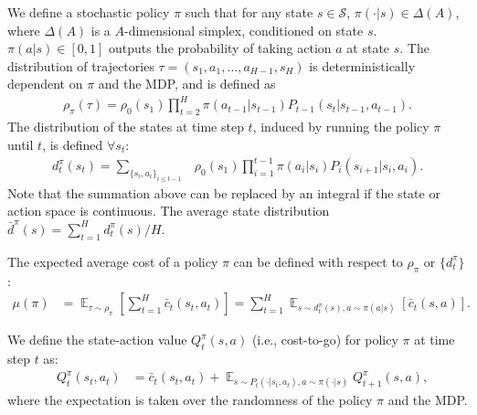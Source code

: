 \documentclass{article}
\begin{document}
We define a stochastic policy $\pi$ such that for any state $s\in\mathcal{S}$, $\pi(\cdot | s)\in \Delta(A)$, where $\Delta(A)$ is a $A$-dimensional simplex, conditioned on state $s$. $\pi(a|s)\in[0,1]$ outputs the probability of taking action $a$ at state $s$. The distribution of trajectories $\tau = (s_1, a_1, \hdots,a_{H-1}, s_H)$ is deterministically dependent on $\pi$ and the MDP, and is defined as
\begin{align}
\rho_{\pi}(\tau) = \rho_0(s_1) \prod_{t=2}^{H} \pi(a_{t-1}|s_{t-1})P_{t-1}(s_t|s_{t-1}, a_{t-1}).\nonumber
\end{align}
%
%
The distribution of the states at time step $t$, induced by running the policy $\pi$ until $t$, is defined  $\forall s_t$:
\begin{align}
d_t^{\pi}(s_{t}) = \sum_{\{s_i,a_i\}_{i\leq t-1}} &\rho_{0}(s_1)\prod_{i=1}^{t-1}\pi(a_i|s_i)P_{i}(s_{i+1}|s_{i},a_{i}). \nonumber
\end{align} Note that the summation above can be replaced by an integral if the state or action space is continuous. The average state distribution $\bar{d}^{\pi}(s) = \sum_{t=1}^H d_t^{\pi}(s) / H$. 

The expected average cost of a policy $\pi$ can be defined with respect to $\rho_{\pi}$ or $\{d_t^{\pi}\}$:
\small
\begin{align}
\mu(\pi) &= \mathop{\mathbb{E}}_{\tau\sim \rho_{\pi}}\left [\sum_{t=1}^H \bar{c}_t(s_t,a_t)\right ]= \sum_{t=1}^H\mathop{\mathbb{E}}_{s\sim {d}_t^{\pi}(s),a\sim\pi(a|s)}\left [\bar{c}_t(s,a)\right ].\nonumber
\end{align}
\normalsize


We define the state-action value $Q_t^{\pi}(s,a)$ (i.e., cost-to-go) for policy $\pi$ at time step $t$ as:
\begin{align}
&Q_t^{\pi}(s_t,a_t) %
&=\bar{c}_t(s_t,a_t) + \mathop{\mathbb{E}}_{s\sim P_t(\cdot|s_t,a_t),a\sim\pi(\cdot|s)}Q^\pi_{t+1}(s,a), \nonumber
\end{align} where the expectation is taken over the randomness of the policy $\pi$ and the MDP. 
\end{document}
